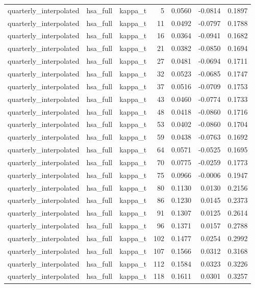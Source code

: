 \begin{tabular}{lllrrrr}
quarterly\_interpolated & hsa\_full & kappa\_t & 5 & 0.0560 & -0.0814 & 0.1897 \\
quarterly\_interpolated & hsa\_full & kappa\_t & 11 & 0.0492 & -0.0797 & 0.1788 \\
quarterly\_interpolated & hsa\_full & kappa\_t & 16 & 0.0364 & -0.0941 & 0.1682 \\
quarterly\_interpolated & hsa\_full & kappa\_t & 21 & 0.0382 & -0.0850 & 0.1694 \\
quarterly\_interpolated & hsa\_full & kappa\_t & 27 & 0.0481 & -0.0694 & 0.1711 \\
quarterly\_interpolated & hsa\_full & kappa\_t & 32 & 0.0523 & -0.0685 & 0.1747 \\
quarterly\_interpolated & hsa\_full & kappa\_t & 37 & 0.0516 & -0.0709 & 0.1753 \\
quarterly\_interpolated & hsa\_full & kappa\_t & 43 & 0.0460 & -0.0774 & 0.1733 \\
quarterly\_interpolated & hsa\_full & kappa\_t & 48 & 0.0418 & -0.0860 & 0.1716 \\
quarterly\_interpolated & hsa\_full & kappa\_t & 53 & 0.0402 & -0.0860 & 0.1704 \\
quarterly\_interpolated & hsa\_full & kappa\_t & 59 & 0.0438 & -0.0763 & 0.1692 \\
quarterly\_interpolated & hsa\_full & kappa\_t & 64 & 0.0571 & -0.0525 & 0.1695 \\
quarterly\_interpolated & hsa\_full & kappa\_t & 70 & 0.0775 & -0.0259 & 0.1773 \\
quarterly\_interpolated & hsa\_full & kappa\_t & 75 & 0.0966 & -0.0006 & 0.1947 \\
quarterly\_interpolated & hsa\_full & kappa\_t & 80 & 0.1130 & 0.0130 & 0.2156 \\
quarterly\_interpolated & hsa\_full & kappa\_t & 86 & 0.1230 & 0.0145 & 0.2373 \\
quarterly\_interpolated & hsa\_full & kappa\_t & 91 & 0.1307 & 0.0125 & 0.2614 \\
quarterly\_interpolated & hsa\_full & kappa\_t & 96 & 0.1371 & 0.0157 & 0.2788 \\
quarterly\_interpolated & hsa\_full & kappa\_t & 102 & 0.1477 & 0.0254 & 0.2992 \\
quarterly\_interpolated & hsa\_full & kappa\_t & 107 & 0.1566 & 0.0312 & 0.3168 \\
quarterly\_interpolated & hsa\_full & kappa\_t & 112 & 0.1584 & 0.0323 & 0.3226 \\
quarterly\_interpolated & hsa\_full & kappa\_t & 118 & 0.1611 & 0.0301 & 0.3257 \\

\end{tabular}
